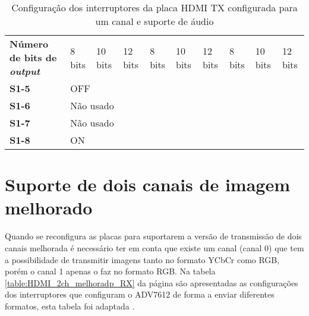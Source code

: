 \begin{table}[h!]
{\begin{tabular}{@{}llllllllll@{}}
			\multicolumn{1}{l|}{\textbf{Número de bits de \textit{output}}} & 8 bits & 10 bits & 12 bits & 8 bits & 10 bits & 12 bits & 8 bits & 10 bits & 12 bits \\
			\multicolumn{1}{l|}{\textbf{S1-5}} & \multicolumn{9}{l}{OFF} \\
			\multicolumn{1}{l|}{\textbf{S1-6}} & \multicolumn{9}{l}{Não usado} \\
			\multicolumn{1}{l|}{\textbf{S1-7}} & \multicolumn{9}{l}{Não usado} \\
			\multicolumn{1}{l|}{\textbf{S1-8}} & \multicolumn{9}{l}{ON} \\ \bottomrule
		\end{tabular}%
	}
	
	\caption{Configuração dos interruptores da placa HDMI TX configurada para um canal e suporte de áudio}
	\label{table:HDMI_1ch+audio_switches_TX}
\end{table}

\section{Suporte de dois canais de imagem melhorado} \label{subsubsec:HDMIconfigMelhorado_switches}

Quando se reconfigura as placas para suportarem a versão de transmissão de dois canais melhorada é necessário ter em conta que existe um canal (canal 0) que tem a possibilidade de transmitir imagens tanto no formato YCbCr como RGB, porém o canal 1 apenas o faz no formato RGB. Na tabela \ref{table:HDMI_2ch_melhoradp_RX} da página \pageref{table:HDMI_2ch_melhoradp_RX} são apresentadas as configurações dos interruptores que configuram o ADV7612 de forma a enviar diferentes formatos, esta tabela foi adaptada \cite{R013}.

